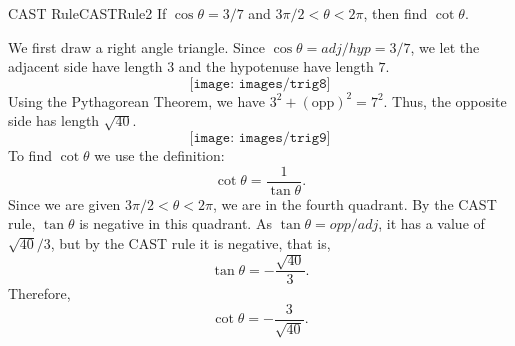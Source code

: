 \begin{example}{CAST Rule}{CASTRule2}
If $\cos\theta=3/7$ and $3\pi/2<\theta< 2\pi$, then find $\cot\theta$.
\end{example}

\begin{solution} 
We first draw a right angle triangle.
Since $\cos\theta=adj/hyp=3/7$, we let the adjacent side have length $3$ and the hypotenuse have length $7$.
$$\texttt{[image: images/trig8]}$$
Using the Pythagorean Theorem, we have $3^2+(\mbox{opp})^2=7^2$.
Thus, the opposite side has length $\sqrt{40}$.
$$\texttt{[image: images/trig9]}$$
To find $\cot\theta$ we use the definition:
$$\cot\theta=\frac{1}{\tan\theta}.$$
Since we are given $3\pi/2<\theta< 2\pi$, we are in the fourth quadrant. By the CAST rule, $\tan\theta$ is negative in this quadrant.
As $\tan\theta=opp/adj$, it has a value of $\sqrt{40}/3$, but by the CAST rule it is negative, that is,
$$\tan\theta=-\frac{\sqrt{40}}{3}.$$
Therefore,
$$\cot\theta=-\frac{3}{\sqrt{40}}.$$
\end{solution}